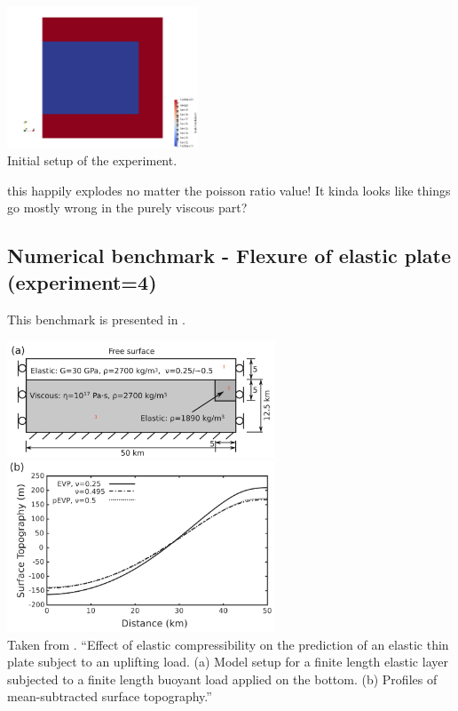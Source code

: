 \begin{center}
\includegraphics[width=5.7cm]{python_codes/fieldstone_129/results/experiment3/K}\\
{\captionfont Initial setup of the experiment.}
\end{center} 

{\color{red} this happily explodes no matter the poisson ratio value!}
It kinda looks like things go mostly wrong in the purely viscous part?



\newpage
\subsection*{Numerical benchmark - Flexure of elastic plate (experiment=4)}

This benchmark is presented in \textcite{chtl13}. 

\begin{center}
\includegraphics[width=8cm]{python_codes/fieldstone_129/images/chtl13a}
\includegraphics[width=8cm]{python_codes/fieldstone_129/images/chtl13b}\\
{\captionfont 
Taken from \textcite{chtl13}. ``Effect of elastic compressibility on the prediction 
of an elastic thin plate subject to an uplifting load. (a)
Model setup for a finite length elastic layer subjected to a
finite length buoyant load applied on the bottom. (b) Profiles
of mean-subtracted surface topography.''}
\end{center}


